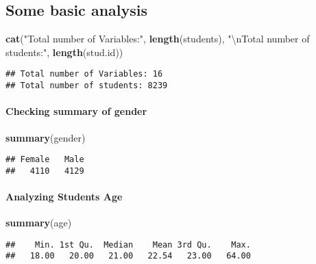 \documentclass[
]{article}
\newenvironment{Shaded}{\begin{snugshade}}{\end{snugshade}}
\newcommand{\CharTok}[1]{\textcolor[rgb]{0.31,0.60,0.02}{#1}}
\newcommand{\KeywordTok}[1]{\textcolor[rgb]{0.13,0.29,0.53}{\textbf{#1}}}
\newcommand{\NormalTok}[1]{#1}
\newcommand{\StringTok}[1]{\textcolor[rgb]{0.31,0.60,0.02}{#1}}
\begin{document}
\hypertarget{some-basic-analysis}{%
\subsection{Some basic analysis}\label{some-basic-analysis}}

\begin{Shaded}
\begin{Highlighting}[]
\KeywordTok{cat}\NormalTok{(}\StringTok{"Total number of Variables:"}\NormalTok{, }\KeywordTok{length}\NormalTok{(students), }
    \StringTok{"}\CharTok{\textbackslash{}n}\StringTok{Total number of students:"}\NormalTok{, }\KeywordTok{length}\NormalTok{(stud.id))}
\end{Highlighting}
\end{Shaded}

\begin{verbatim}
## Total number of Variables: 16 
## Total number of students: 8239
\end{verbatim}

\hypertarget{checking-summary-of-gender}{%
\paragraph{Checking summary of
gender}\label{checking-summary-of-gender}}

\begin{Shaded}
\begin{Highlighting}[]
\KeywordTok{summary}\NormalTok{(gender)}
\end{Highlighting}
\end{Shaded}

\begin{verbatim}
## Female   Male 
##   4110   4129
\end{verbatim}

\hypertarget{analyzing-students-age}{%
\paragraph{Analyzing Students Age}\label{analyzing-students-age}}

\begin{Shaded}
\begin{Highlighting}[]
\KeywordTok{summary}\NormalTok{(age)}
\end{Highlighting}
\end{Shaded}

\begin{verbatim}
##    Min. 1st Qu.  Median    Mean 3rd Qu.    Max. 
##   18.00   20.00   21.00   22.54   23.00   64.00
\end{verbatim}
\end{document}
